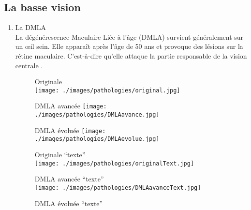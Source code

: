 \documentclass[french,a4paper]{report}
\begin{document}
{\subsection{La basse vision}
\begin{enumerate}
\item La DMLA
\\La dégénérescence Maculaire Liée à l'âge (DMLA) survient généralement sur un œil sein. Elle
apparaît après l'âge de 50 ans et provoque des lésions sur la rétine maculaire. C'est-à-dire
qu'elle attaque la partie responsable de la vision centrale \cite{descpatdmla}.\\
\begin{figure}[H]
\begin{minipage}{0.5\textwidth}
\centering
Originale \\ \vspace{0.2cm}
\texttt{[image: ./images/pathologies/original.jpg]}
\end{minipage}
\begin{minipage}{0.5\textwidth}
\centering
DMLA avancée\vspace{0.2cm}
\texttt{[image: ./images/pathologies/DMLAavance.jpg]}
\end{minipage}
\begin{minipage}{0.5\textwidth}
\centering
\vspace{0.4cm}DMLA évoluée\vspace{0.2cm}
\texttt{[image: ./images/pathologies/DMLAevolue.jpg]}
\end{minipage}
\begin{minipage}{0.5\textwidth}
\centering
\vspace{0.4cm}Originale \enquote{texte}\\ \vspace{0.1cm}
\texttt{[image: ./images/pathologies/originalText.jpg]}
\end{minipage}
\begin{minipage}{0.5\textwidth}
\centering
\vspace{0.4cm}DMLA avancée \enquote{texte}\\ \vspace{0.1cm}
\texttt{[image: ./images/pathologies/DMLAavanceText.jpg]}
\end{minipage}
\begin{minipage}{0.5\textwidth}
\centering
\vspace{0.4cm}DMLA évoluée \enquote{texte}\\ \vspace{0.1cm}

\end{minipage}
\end{figure}
\end{enumerate}}
\end{document}
